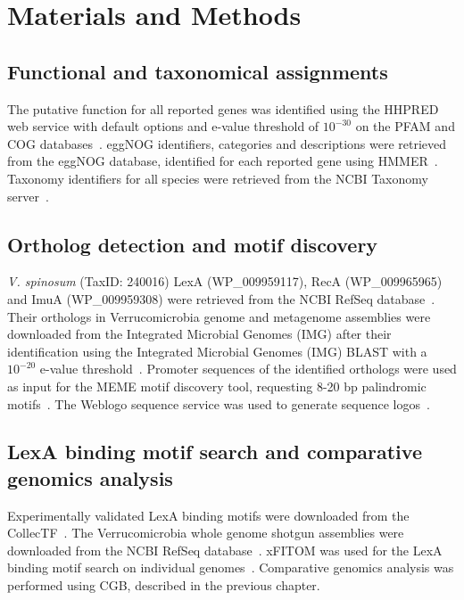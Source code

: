 \section{Materials and Methods}

\subsection{Functional and taxonomical assignments}
The putative function for all reported genes was identified using the HHPRED
web service with default options and e-value threshold of $10^{-30}$ on the
PFAM and COG databases~\cite{soding2005hhpred, finn2015pfam,
  tatusov2000cog}. eggNOG identifiers, categories and descriptions were
retrieved from the eggNOG database, identified for each reported gene using
HMMER~\cite{powell2013eggnog, eddy2011accelerated}. Taxonomy identifiers for
all species were retrieved from the NCBI Taxonomy
server~\cite{federhen2012ncbi}.

\subsection{Ortholog detection and motif discovery}
\textit{V. spinosum} (TaxID: 240016) LexA (WP\_009959117), RecA (WP\_009965965)
and ImuA \mbox{(WP\_009959308)} were retrieved from the NCBI RefSeq
database~\cite{pruitt2007ncbi}. Their orthologs in Verrucomicrobia genome and
metagenome assemblies were downloaded from the Integrated Microbial Genomes
(IMG) after their identification using the Integrated Microbial Genomes (IMG)
BLAST with a $10^{-20}$ e-value threshold~\cite{markowitz2012img,
  altschul1997gapped}. Promoter sequences of the identified orthologs were used
as input for the MEME motif discovery tool, requesting 8-20 bp palindromic
motifs~\cite{bailey2015meme}. The Weblogo sequence service was used to generate
sequence logos~\cite{crooks2004weblogo}.

\subsection{LexA binding motif search and comparative genomics analysis}
Experimentally validated LexA binding motifs were downloaded from the
CollecTF~\cite{kilic2013collectf}. The Verrucomicrobia whole genome shotgun
assemblies were downloaded from the NCBI RefSeq
database~\cite{o2015reference}. xFITOM was used for the LexA binding motif
search on individual genomes~\cite{bhargava2010xfitom}. Comparative genomics
analysis was performed using CGB, described in the previous chapter.


